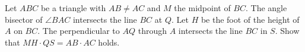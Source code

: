Let $ABC$ be a triangle with $AB \neq AC$ and $M$ the midpoint of $BC$. The angle bisector of $\angle BAC$ intersects the line $BC$ at $Q$. Let $H$ be the foot of the height of $A$ on $BC$. The perpendicular to $AQ$ through $A$ intersects the line $BC$ in $S$. Show that $MH \cdot QS = AB \cdot AC$ holds.